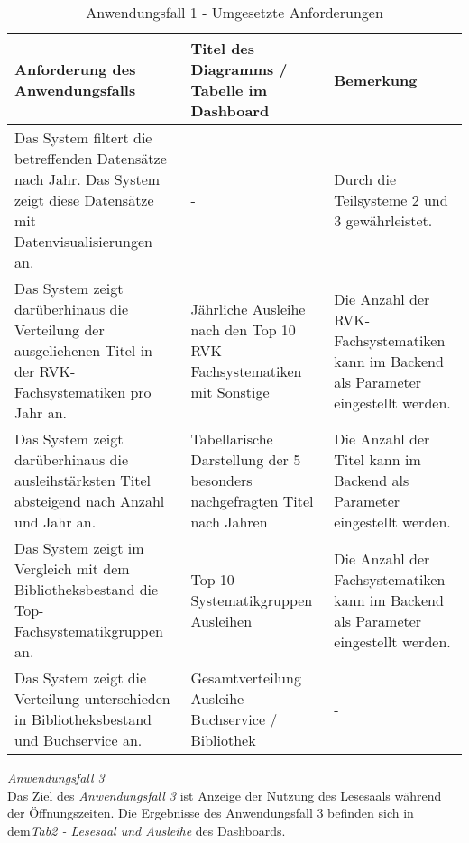 \begingroup
    \setlength{\tabcolsep}{12pt} %
    \renewcommand{\arraystretch}{1.5} 
    \begin{table}[H]
        \centering
        \begin{adjustbox}{max width=\textwidth}
        \begin{tabular}{p{}p{}p{}}
           \toprule
           Anforderung des Anwendungsfalls        &Titel des Diagramms / Tabelle im Dashboard &Bemerkung\\
           \midrule
           Das System filtert die betreffenden Datensätze nach Jahr. Das System zeigt diese Datensätze mit Datenvisualisierungen an.&-&Durch die Teilsysteme 2  und 3 gewährleistet.\\
           Das System zeigt darüberhinaus die Verteilung der ausgeliehenen Titel in der RVK-Fachsystematiken pro Jahr an.&Jährliche Ausleihe nach den Top 10 RVK-Fachsystematiken mit Sonstige& Die Anzahl der RVK-Fachsystematiken kann im Backend als Parameter eingestellt werden.\\
           Das System zeigt darüberhinaus die ausleihstärksten Titel absteigend nach Anzahl und Jahr an.& Tabellarische Darstellung der 5 besonders nachgefragten Titel nach Jahren&Die Anzahl der Titel kann im Backend als Parameter eingestellt werden.\\
           Das System zeigt im Vergleich mit dem Bibliotheksbestand die Top-Fachsystematikgruppen an.&Top 10 Systematikgruppen Ausleihen\footnotemark&Die Anzahl der Fachsystematiken kann im Backend als Parameter eingestellt werden.\\
           Das System zeigt die Verteilung unterschieden in Bibliotheksbestand und Buchservice an.&Gesamtverteilung Ausleihe Buchservice / Bibliothek&-\\
        \bottomrule
        \end{tabular}
        \end{adjustbox}
        \caption{%
            Anwendungsfall 1 - Umgesetzte Anforderungen
        }
        \label{tab:Anwendungsfall 1 - Umgesetzte Anforderungen}
        \end{table}


    \endgroup

\noindent
\textit{Anwendungsfall 3}\\
Das Ziel des \textit{Anwendungsfall 3} ist Anzeige der Nutzung des Lesesaals während der Öffnungszeiten.
Die Ergebnisse des Anwendungsfall 3 befinden sich in dem\textit{Tab2 - Lesesaal und Ausleihe} des Dashboards.

